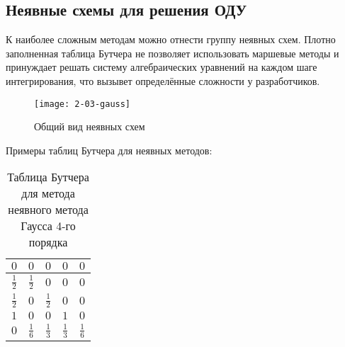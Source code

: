 \subsection{Неявные схемы для решения ОДУ}

К наиболее сложным методам можно отнести группу неявных схем. Плотно заполненная таблица Бутчера не позволяет использовать маршевые
методы и принуждает решать систему алгебраических уравнений на каждом шаге интегрирования, что вызывет определённые сложности у
разработчиков.


\begin{figure}
    \texttt{[image: 2-03-gauss]}
    \caption{Общий вид неявных схем}
    \label{fig:gauss}
\end{figure}

Примеры таблиц Бутчера для неявных методов:

\begin{table}    
    \caption{Таблица Бутчера для метода неявного метода Гаусса 4-го порядка}
    \begin{tabular}{|c|c|c|c|c|}
    \hline
    $0$ & $0$ & $0$ & $0$ & $0$\\
    \hline
    $\frac{1}{2}$ & $\frac{1}{2}$ & $0$ & $0$ & $0$\\
    \hline
    $\frac{1}{2}$ & $0$ & $\frac{1}{2}$ & $0$ & $0$\\
    \hline
    $1$ & $0$ & $0$ & $1$ & $0$\\
    \hline
    $0$ & \cellcolor{lightgray} $\frac{1}{6}$ & \cellcolor{lightgray} $\frac{1}{3}$ & \cellcolor{lightgray} $\frac{1}{3}$ & \cellcolor{lightgray} $\frac{1}{6}$\\
    \hline
    \end{tabular}
    \label{tab:RK4}
\end{table}

